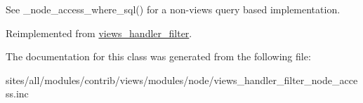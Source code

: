 See \_\-node\_\-access\_\-where\_\-sql() for a non-views query based implementation. 

Reimplemented from \hyperlink{classviews__handler__filter_8e513b3abbc2559f37b550ca4957b4ae}{views\_\-handler\_\-filter}.

The documentation for this class was generated from the following file:\begin{CompactItemize}
\item 
sites/all/modules/contrib/views/modules/node/views\_\-handler\_\-filter\_\-node\_\-access.inc\end{CompactItemize}
